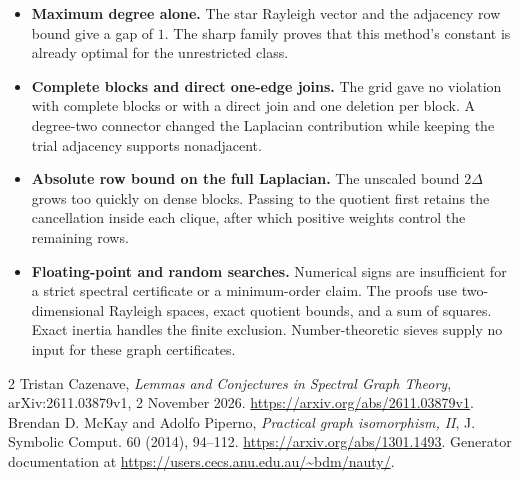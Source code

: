 \documentclass[11pt,a4paper]{article}
\begin{document}
\begin{itemize}
\item \textbf{Maximum degree alone.} The star Rayleigh vector and the adjacency row bound give a gap of $1$. The sharp family proves that this method's constant is already optimal for the unrestricted class.
\item \textbf{Complete blocks and direct one-edge joins.} The grid gave no violation with complete blocks or with a direct join and one deletion per block. A degree-two connector changed the Laplacian contribution while keeping the trial adjacency supports nonadjacent.
\item \textbf{Absolute row bound on the full Laplacian.} The unscaled bound $2\Delta$ grows too quickly on dense blocks. Passing to the quotient first retains the cancellation inside each clique, after which positive weights control the remaining rows.
\item \textbf{Floating-point and random searches.} Numerical signs are insufficient for a strict spectral certificate or a minimum-order claim. The proofs use two-dimensional Rayleigh spaces, exact quotient bounds, and a sum of squares. Exact inertia handles the finite exclusion. Number-theoretic sieves supply no input for these graph certificates.
\end{itemize}

\begin{thebibliography}{2}
 Tristan Cazenave, \emph{Lemmas and Conjectures in Spectral Graph Theory}, arXiv:2611.03879v1, 2 November 2026. \url{https://arxiv.org/abs/2611.03879v1}.
 Brendan D. McKay and Adolfo Piperno, \emph{Practical graph isomorphism, II}, J. Symbolic Comput. 60 (2014), 94--112. \url{https://arxiv.org/abs/1301.1493}. Generator documentation at \url{https://users.cecs.anu.edu.au/~bdm/nauty/}.
\end{thebibliography}
\end{document}
